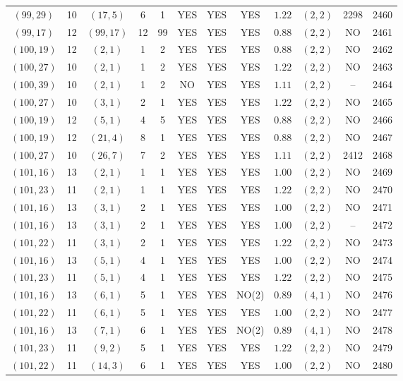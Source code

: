 \begin{longtable}{|c|c|c|c|c|c|c|c|c|c|c|c|}
$(99,29)$ & 10 & $(17,5)$ & 6 & 1 & YES & YES & YES & $1.22$ & $(2,2)$ & 2298 & 2460\\
$(99,17)$ & 12 & $(99,17)$ & 12 & 99 & YES & YES & YES & $0.88$ & $(2,2)$ & NO & 2461\\
$(100,19)$ & 12 & $(2,1)$ & 1 & 2 & YES & YES & YES & $0.88$ & $(2,2)$ & NO & 2462\\
$(100,27)$ & 10 & $(2,1)$ & 1 & 2 & YES & YES & YES & $1.22$ & $(2,2)$ & NO & 2463\\
$(100,39)$ & 10 & $(2,1)$ & 1 & 2 & NO & YES & YES & $1.11$ & $(2,2)$ & -- & 2464\\
$(100,27)$ & 10 & $(3,1)$ & 2 & 1 & YES & YES & YES & $1.22$ & $(2,2)$ & NO & 2465\\
$(100,19)$ & 12 & $(5,1)$ & 4 & 5 & YES & YES & YES & $0.88$ & $(2,2)$ & NO & 2466\\
$(100,19)$ & 12 & $(21,4)$ & 8 & 1 & YES & YES & YES & $0.88$ & $(2,2)$ & NO & 2467\\
$(100,27)$ & 10 & $(26,7)$ & 7 & 2 & YES & YES & YES & $1.11$ & $(2,2)$ & 2412 & 2468\\
$(101,16)$ & 13 & $(2,1)$ & 1 & 1 & YES & YES & YES & $1.00$ & $(2,2)$ & NO & 2469\\
$(101,23)$ & 11 & $(2,1)$ & 1 & 1 & YES & YES & YES & $1.22$ & $(2,2)$ & NO & 2470\\
$(101,16)$ & 13 & $(3,1)$ & 2 & 1 & YES & YES & YES & $1.00$ & $(2,2)$ & NO & 2471\\
$(101,16)$ & 13 & $(3,1)$ & 2 & 1 & YES & YES & YES & $1.00$ & $(2,2)$ & -- & 2472\\
$(101,22)$ & 11 & $(3,1)$ & 2 & 1 & YES & YES & YES & $1.22$ & $(2,2)$ & NO & 2473\\
$(101,16)$ & 13 & $(5,1)$ & 4 & 1 & YES & YES & YES & $1.00$ & $(2,2)$ & NO & 2474\\
$(101,23)$ & 11 & $(5,1)$ & 4 & 1 & YES & YES & YES & $1.22$ & $(2,2)$ & NO & 2475\\
$(101,16)$ & 13 & $(6,1)$ & 5 & 1 & YES & YES & NO(2) & $0.89$ & $(4,1)$ & NO & 2476\\
$(101,22)$ & 11 & $(6,1)$ & 5 & 1 & YES & YES & YES & $1.00$ & $(2,2)$ & NO & 2477\\
$(101,16)$ & 13 & $(7,1)$ & 6 & 1 & YES & YES & NO(2) & $0.89$ & $(4,1)$ & NO & 2478\\
$(101,23)$ & 11 & $(9,2)$ & 5 & 1 & YES & YES & YES & $1.22$ & $(2,2)$ & NO & 2479\\
$(101,22)$ & 11 & $(14,3)$ & 6 & 1 & YES & YES & YES & $1.00$ & $(2,2)$ & NO & 2480\\

\end{longtable}
